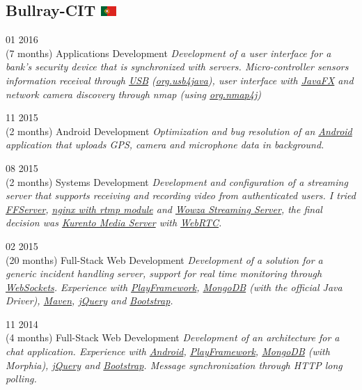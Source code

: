 \documentclass[]{friggeri-cv}
\begin{document}
	\subsection{Bullray-CIT \includegraphics[width=16pt]{pt}}  
		\begin{entrylist}
			\entry
			{01 2016\\(7 months)}
			{Applications Development}
			{}			
			{\emph{Development of a user interface for a bank's security device that is synchronized with servers. Micro-controller sensors information receival through \underline{USB} (\underline{org.usb4java}), user interface with \underline{JavaFX} and network camera discovery through nmap (using \underline{org.nmap4j}) } }

			\entry
			{11 2015\\(2 months)}
			{Android Development}
			{}
			{\emph{Optimization and bug resolution of an \underline{Android} application that uploads GPS, camera and microphone data in background.}}


			\entry
			{08 2015\\(2 months)}
			{Systems Development}
			{}
			{\emph{Development and configuration of a streaming server that supports receiving and recording video from authenticated users. I tried \underline{FFServer}, \underline{nginx with rtmp module} and \underline{Wowza Streaming Server}, the final decision was \underline{Kurento Media Server} with \underline{WebRTC}. }}

			\entry
			{02 2015\\(20 months)}
			{Full-Stack Web Development}
			{}
			{\emph{Development of a solution for a generic incident handling server, support for real time monitoring through \underline{WebSockets}. Experience with \underline{PlayFramework}, \underline{MongoDB} (with the official Java Driver), \underline{Maven}, \underline{jQuery} and \underline{Bootstrap}.}}

			\entry
			{11 2014\\(4 months)}
			{Full-Stack Web Development}
			{}
			{\emph{Development of an architecture for a chat application. Experience with \underline{Android}, \underline{PlayFramework}, \underline{MongoDB} (with Morphia), \underline{jQuery} and \underline{Bootstrap}. Message synchronization through HTTP long polling.}}
			
	
		\end{entrylist}
\end{document}
